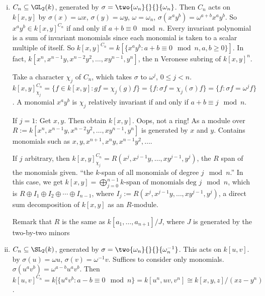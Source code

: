 \begin{ex} \hfill
\begin{enumerate}[(i)]
\item $C_n \subseteq \GL_2(k)$, generated by $\sigma= \two{\omega_n}{}{}{\omega_n}$. Then $C_n$ acts on $k[x,y]$ by $\sigma(x)= \omega x$, $\sigma(y)= \omega y$, $\omega=\omega_n$, $\sigma(x^ay^b)= \omega^{a+b} x^ay^b$. So $x^ay^b \in k[x,y]^{C_n}$ if and only if $a+b \equiv 0 \mod n$. Every invariant polynomial is a sum of invariant monomials since each monomial is taken to a scalar multiple of itself. So $k[x,y]^{C_n}= k[\{x^ay^b \colon a+b \equiv 0 \mod n, a,b \geq 0\}]$. In fact, $k[x^n,x^{n-1}y,x^{n-2}y^2,\ldots,xy^{n-1},y^n]$, the n Veronese subring of $k[x,y]^n$. 

Take a character $\chi_j$ of $C_n$, which takes $\sigma$ to $\omega^j$, $0 \leq j< n$. $k[x,y]^{C_n}_{\chi_j}= \{ f \in k[x,y] \colon gf= \chi_j(g)f \}= \{ f \colon \sigma f= \chi_j(\sigma)f \}= \{ f \colon \sigma f= \omega^j f\}$. A monomial $x^ay^b$ is $\chi_j$ relatively invariant if and only if $a+b \equiv j \mod n$. 

If $j=1$: Get $x, y$. Then obtain $k[x,y]$. Oops, not a ring! As a module over $R:= k[x^n,x^{n-1}y,x^{n-2}y^2,\ldots,xy^{n-1},y^n]$ is generated by $x$ and $y$. Contains monomials such as $x,y, x^{n+1}, x^ny, x^{n-1}y^2,\ldots$. 

If $j$ arbitrary, then $k[x,y]^{C_n}_{\chi_j}= R(x^j,x^{j-1}y, \ldots,xy^{j-1},y^j)$, the $R$ span of the monomials given. ``the $k$-span of all monomials of degree $j \mod n$.'' In this case, we get $k[x,y]= \bigoplus_{j=0}^{n-1} \text{$k$-span of monomials deg } j \mod n$, which is $R \oplus I_1 \oplus I_2 \oplus \cdots \oplus I_{n-1}$, where $I_j:= R(x^j,x^{j-1}y, \ldots,xy^{j-1},y^j)$, a direct sum decomposition of $k[x,y]$ as an $R$-module. 


Remark that $R$ is the same as $k[a_1,\ldots,a_{n+1}]/J$, where $J$ is generated by the two-by-two minors 


\item $C_n \subseteq \SL_2(k)$, generated by $\sigma = \two{\omega_n}{}{}{\omega_n^{-1}}$. This acts on $k[u,v]$. by $\sigma(u)= \omega u$, $\sigma(v)= \omega^{-1} v$. Suffices to consider only monomials. $\sigma(u^av^b)= \omega^{a-b} u^av^b$. Then $k[u,v]^{C_n}= k[\{u^av^b \colon a-b \equiv 0 \mod n \}= k[u^n,uv,v^n] \cong k[x,y,z]/(xz-y^n)$. 


\end{enumerate}
\end{ex}

